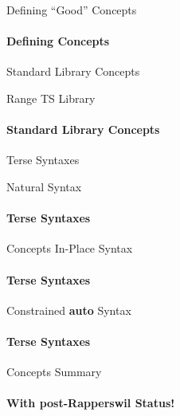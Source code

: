 \documentclass{beamer}
\begin{document}
    \begin{frame}[fragile]{Defining ``Good'' Concepts}
        \framesubtitle{Defining Concepts}
    \end{frame}

    \begin{frame}[fragile]{Standard Library Concepts}
    \end{frame}

    \begin{frame}[fragile]{Range TS Library}
        \framesubtitle{Standard Library Concepts}
    \end{frame}

    \begin{frame}[fragile]{Terse Syntaxes}
    \end{frame}

    \begin{frame}[fragile]{Natural Syntax}
        \framesubtitle{Terse Syntaxes}
    \end{frame}

    \begin{frame}[fragile]{Concepts In-Place Syntax}
        \framesubtitle{Terse Syntaxes}
    \end{frame}

    \begin{frame}[fragile]{Constrained \textbf{auto} Syntax}
        \framesubtitle{Terse Syntaxes}
    \end{frame}

    \begin{frame}[fragile]{Concepts Summary}
        \framesubtitle{With post-Rapperswil Status!}
    \end{frame}
\end{document}
